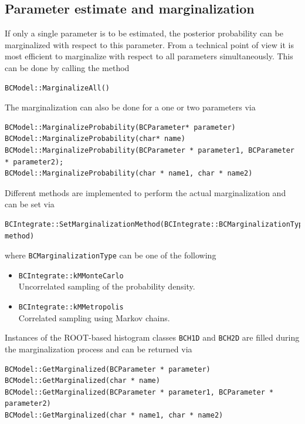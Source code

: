 \documentclass[11pt, a4paper]{article}
\begin{document}

\subsection{Parameter estimate and marginalization} 

If only a single parameter is to be estimated, the posterior
probability can be marginalized with respect to this parameter. From a
technical point of view it is most efficient to marginalize with
respect to all parameters simultaneously. This can be done by calling
the method
%
\begin{small}
\begin{verbatim}
BCModel::MarginalizeAll() 
\end{verbatim} 
\end{small} 

\noindent 
The marginalization can also be done for a one or two parameters via 
%
\begin{small}
\begin{verbatim}
BCModel::MarginalizeProbability(BCParameter* parameter)
BCModel::MarginalizeProbability(char* name) 
BCModel::MarginalizeProbability(BCParameter * parameter1, BCParameter * parameter2);
BCModel::MarginalizeProbability(char * name1, char * name2)
\end{verbatim} 
\end{small} 

\noindent 
Different methods are implemented to perform the actual
marginalization and can be set via
%
\begin{small}
\begin{verbatim}
BCIntegrate::SetMarginalizationMethod(BCIntegrate::BCMarginalizationType method)
\end{verbatim} 
\end{small} 

\noindent
where \verb|BCMarginalizationType| can be one of the following 
% 
\begin{itemize}
\item \verb|BCIntegrate::kMMonteCarlo| \\ 
 Uncorrelated sampling of the probability density. 
\item \verb|BCIntegrate::kMMetropolis| \\ 
 Correlated sampling using Markov chains. 
\end{itemize} 

\noindent 
Instances of the ROOT-based histogram classes \verb|BCH1D| and
\verb|BCH2D| are filled during the marginalization process and can be
returned via 
%
\begin{small}
\begin{verbatim}
BCModel::GetMarginalized(BCParameter * parameter) 
BCModel::GetMarginalized(char * name) 
BCModel::GetMarginalized(BCParameter * parameter1, BCParameter * parameter2) 
BCModel::GetMarginalized(char * name1, char * name2) 
\end{verbatim} 
\end{small} 
\end{document}
